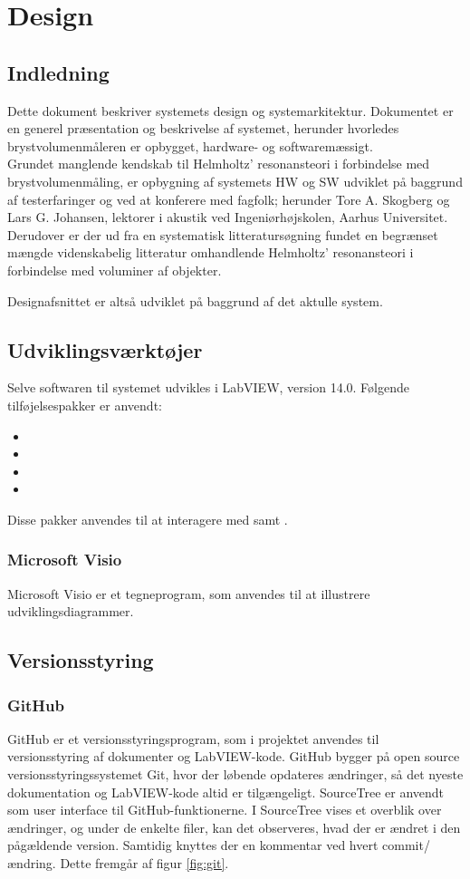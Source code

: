
\chapter{Design}
\section{Indledning}
Dette dokument beskriver systemets design og systemarkitektur. Dokumentet er en generel præsentation og beskrivelse af systemet, herunder hvorledes brystvolumenmåleren er opbygget, hardware-  og softwaremæssigt. \\
Grundet manglende kendskab til Helmholtz' resonansteori i forbindelse med brystvolumenmåling, er opbygning af systemets HW og SW udviklet på baggrund af testerfaringer og ved at konferere med fagfolk; herunder Tore A. Skogberg og Lars G. Johansen, lektorer i akustik ved Ingeniørhøjskolen, Aarhus Universitet. Derudover er der ud fra en systematisk litteratursøgning fundet en begrænset mængde videnskabelig litteratur omhandlende Helmholtz' resonansteori i forbindelse med voluminer af objekter.

Designafsnittet er altså udviklet på baggrund af det aktulle system. 

\section{Udviklingsværktøjer}
Selve softwaren til systemet udvikles i LabVIEW, version 14.0. Følgende tilføjelsespakker er anvendt:
\begin{itemize}
\item \visa
\item \vi
\item \ardsw	
\item \daqsoft 
\end{itemize}

Disse pakker anvendes til at interagere med \arduino{} samt \daq. 

	\subsection{Microsoft Visio}   
	Microsoft Visio er et tegneprogram, som anvendes til at illustrere udviklingsdiagrammer. 
	
\section{Versionsstyring}
\subsection{GitHub}
GitHub er et versionsstyringsprogram, som i projektet anvendes til versionsstyring af dokumenter og LabVIEW-kode. GitHub
bygger på open source versionsstyringssystemet Git, hvor der løbende opdateres ændringer, så det nyeste dokumentation og LabVIEW-kode altid er tilgængeligt. SourceTree er anvendt som user interface til GitHub-funktionerne. I SourceTree vises et overblik over ændringer, og under de enkelte filer, kan det observeres, hvad der er ændret i den pågældende version. Samtidig knyttes der en kommentar ved hvert commit/ ændring. Dette fremgår af figur \ref{fig:git}. 

